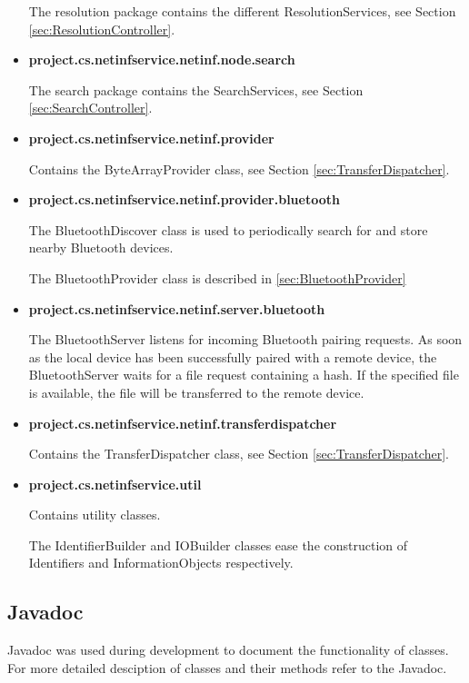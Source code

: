 \begin{itemize}
	The resolution package contains the different ResolutionServices, see Section \ref{sec:ResolutionController}.
	
	\item{\bf project.cs.netinfservice.netinf.node.search}
	
	The search package contains the SearchServices, see Section \ref{sec:SearchController}.
	
	\item{\bf project.cs.netinfservice.netinf.provider}
	
	Contains the ByteArrayProvider class, see Section \ref{sec:TransferDispatcher}.
	
	\item{\bf project.cs.netinfservice.netinf.provider.bluetooth}
	
	The BluetoothDiscover class is used to periodically search for and store nearby Bluetooth devices.
	
	The BluetoothProvider class is described in \ref{sec:BluetoothProvider}
	
	\item{\bf project.cs.netinfservice.netinf.server.bluetooth}
	
	The BluetoothServer listens for incoming Bluetooth pairing requests. As soon as the local device has been 
	successfully paired with a remote device, the BluetoothServer waits for a file request containing a hash. If the specified file is available, 
	the file will be transferred to the remote device.
	
	\item{\bf project.cs.netinfservice.netinf.transferdispatcher}
	
	Contains the TransferDispatcher class, see Section \ref{sec:TransferDispatcher}.
	
	\item{\bf project.cs.netinfservice.util}

	Contains utility classes.
	
	The IdentifierBuilder and IOBuilder classes ease the construction of Identifiers and InformationObjects respectively.
	
\end{itemize}

\subsection{Javadoc}

Javadoc was used during development to document the functionality of classes. For more detailed desciption of classes and their methods refer to the Javadoc.